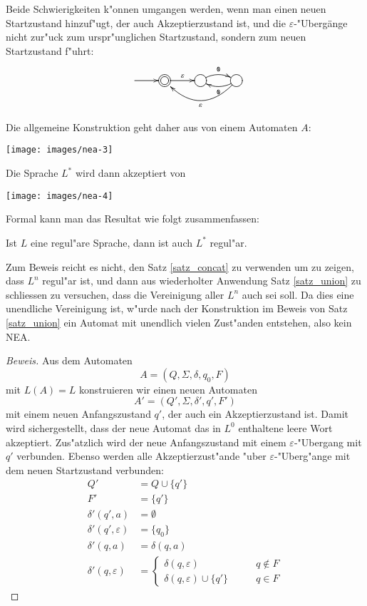 Beide Schwierigkeiten k"onnen umgangen werden, wenn man einen
neuen Startzustand hinzuf"ugt, der auch Akzeptierzustand
ist, und die $\varepsilon$-"Uberg\"ange nicht zur"uck zum
urspr"unglichen Startzustand, sondern zum neuen Startzustand
f"uhrt:
\[
\entrymodifiers={++[o][F]}
\xymatrix{
*+\txt{}\ar[r]
	&*++[o][F=]{}\ar[r]^{\varepsilon}
		&{}\ar@/^/[r]^{\tt 0}
			&{}\ar@/^/[l]^{\tt 0} \ar@/^20pt/[ll]^{\varepsilon}
}
\]

Die allgemeine Konstruktion geht daher aus von einem Automaten $A$:
\begin{center}
\texttt{[image: images/nea-3]}
\end{center}
Die Sprache $L^*$ wird dann akzeptiert von
\begin{center}
\texttt{[image: images/nea-4]}
\end{center}

Formal kann man das Resultat wie folgt zusammenfassen:
\begin{satz}
\label{satz_star}
Ist $L$ eine regul"are Sprache, dann ist auch $L^*$ regul"ar.
\end{satz}

Zum Beweis reicht es nicht, den Satz \ref{satz_concat} zu verwenden
um zu zeigen, dass $L^n$ regul"ar ist, und dann aus wiederholter
Anwendung Satz \ref{satz_union} zu schliessen zu versuchen,
dass die Vereinigung aller $L^n$ auch sei soll. Da dies eine unendliche
Vereinigung ist, w"urde nach der Konstruktion im Beweis von Satz
\ref{satz_union} ein Automat mit unendlich vielen
Zust"anden entstehen, also kein NEA.

\begin{proof}[Beweis]
Aus dem Automaten
\[
A=(Q,\Sigma, \delta,q_0,F)
\]
mit $L(A)=L$ konstruieren wir einen neuen
Automaten
\[
A'=(Q',\Sigma,\delta',q',F')
\]
mit einem neuen Anfangszustand $q'$, der auch
ein Akzeptierzustand ist.
Damit wird sichergestellt, dass der neue Automat das in $L^0$
enthaltene leere Wort akzeptiert.
Zus"atzlich wird der neue Anfangszustand mit einem $\varepsilon$-"Ubergang
mit $q'$ verbunden. 
Ebenso werden alle Akzeptierzust"ande "uber $\varepsilon$-"Uberg"ange
mit dem neuen Startzustand verbunden:
\begin{align*}
Q'&=Q\cup \{q'\}\\
F'&=\{q'\}\\
\delta'(q',a)&=\emptyset\\
\delta'(q',\varepsilon)&= \{q_0\}\\
\delta'(q,a)&= \delta(q,a)\\
\delta'(q,\varepsilon)&=\begin{cases}
\delta(q,\varepsilon)          &\qquad q\not\in F\\
\delta(q,\varepsilon)\cup\{q'\}&\qquad q\in F
\end{cases}
\end{align*}
\end{proof}
